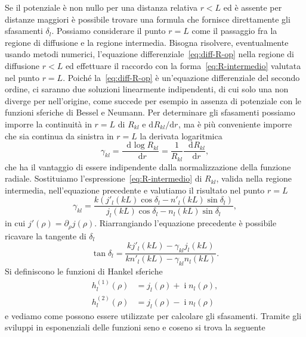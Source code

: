 \documentclass[a4paper,fleqn,twoside,12pt]{article}
\newcommand*{\dd}{\mathop{}\!\mathrm{d}} %
\DeclareMathOperator{\uimm}{\mathrm{i}} %
\newcommand*{\toder}[3][]{\frac{{\dd^{#1}}#2}{\dd {#3}^{#1}}}
\newcommand*{\ltoder}[3][]{\mathrm{d}^{#1}#2 / \mathrm{d} {#3}^{#1}}
\begin{document}
Se il potenziale è non nullo per una distanza relativa $r < L$ ed è assente per
distanze maggiori è possibile trovare una formula che fornisce direttamente gli
sfasamenti $\delta_{l}$.  Possiamo considerare il punto $r = L$ come il
passaggio fra la regione di diffusione e la regione intermedia.  Bisogna
risolvere, eventualmente usando metodi numerici, l'equazione
differenziale~\eqref{eq:diff-R-op} nella regione di diffusione $r < L$ ed
effettuare il raccordo con la forma~\eqref{eq:R-intermedio} valutata nel punto
$r = L$.  Poiché la~\eqref{eq:diff-R-op} è un'equazione differenziale del
secondo ordine, ci saranno due soluzioni linearmente indipendenti, di cui solo
una non diverge per nell'origine, come succede per esempio in assenza di
potenziale con le funzioni sferiche di Bessel e Neumann.  Per determinare gli
sfasamenti possiamo imporre la continuità in $r=L$ di $R_{kl}$ e
$\ltoder{R_{kl}}{r}$, ma è più conveniente imporre che sia continua da sinistra in
$r=L$ la derivata logaritmica
\begin{equation}
  \gamma_{kl} = \toder{\log R_{kl}}{r} = \frac{1}{R_{kl}} \toder{R_{kl}}{r},
\end{equation}
che ha il vantaggio di essere indipendente dalla normalizzazione della funzione
radiale.  Sostituiamo l'espressione~\eqref{eq:R-intermedio} di $R_{kl}$, valida
nella regione intermedia, nell'equazione precedente e valutiamo il risultato nel
punto $r = L$
\begin{equation}
  \gamma_{kl} = \frac{k(j'_{l}(kL)\cos\delta_{l} -
    n'_{l}(kL)\sin\delta_{l})}{j_{l}(kL)\cos\delta_{l} -
    n_{l}(kL)\sin\delta_{l}},
\end{equation}
in cui $j'(\rho) = \partial_{\rho}j(\rho)$.  Riarrangiando l'equazione
precedente è possibile ricavare la tangente di $\delta_{l}$
\begin{equation}
  \label{eq:tangente-sfasamento}
  \tan\delta_{l} = \frac{kj'_{l}(kL) - \gamma_{kl}j_{l}(kL)}{kn'_{l}(kL) -
    \gamma_{kl}n_{l}(kL)}.
\end{equation}
Si definiscono le funzioni di Hankel sferiche
\begin{subequations}
  \begin{align}
    h_{l}^{(1)}(\rho) &= j_{l}(\rho) + \uimm n_{l}(\rho), \\
    h_{l}^{(2)}(\rho) &= j_{l}(\rho) - \uimm n_{l}(\rho)
  \end{align}
\end{subequations}
e vediamo come possono essere utilizzate per calcolare gli sfasamenti.  Tramite
gli sviluppi in esponenziali delle funzioni seno e coseno si trova la seguente
\end{document}
